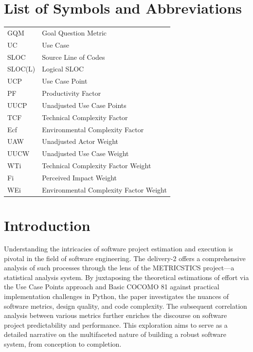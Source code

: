 \documentclass[english,12pt,a4paper]{report}
\begin{document}
	\chapter*{List of Symbols and Abbreviations}
	\noindent\begin{tabular}{ll}
		GQM & Goal Question Metric\\
		UC & Use Case\\
		SLOC & Source Line of Codes\\
		SLOC(L) & Logical SLOC\\
		UCP & Use Case Point\\
		PF & Productivity Factor\\
		UUCP & Unadjusted Use Case Points\\
		TCF & Technical Complexity Factor\\
		Ecf & Environmental Complexity Factor\\
		UAW & Unadjusted Actor Weight\\
		UUCW & Unadjusted Use Case Weight\\
		WTi & Technical Complexity Factor Weight\\
		Fi & Perceived Impact Weight\\
		WEi & Environmental Complexity Factor Weight
		
		
	\end{tabular}
	\listoffigures{}
	\listoftables{}
	
	\chapter{Introduction}
	
	Understanding the intricacies of software project estimation and execution is pivotal in the field of software engineering. The delivery-2 offers a comprehensive analysis of such processes through the lens of the METRICSTICS project—a statistical analysis system. By juxtaposing the theoretical estimations of effort via the Use Case Points approach and Basic COCOMO 81 against practical implementation challenges in Python, the paper investigates the nuances of software metrics, design quality, and code complexity. The subsequent correlation analysis between various metrics further enriches the discourse on software project predictability and performance. This exploration aims to serve as a detailed narrative on the multifaceted nature of building a robust software system, from conception to completion.
\end{document}
